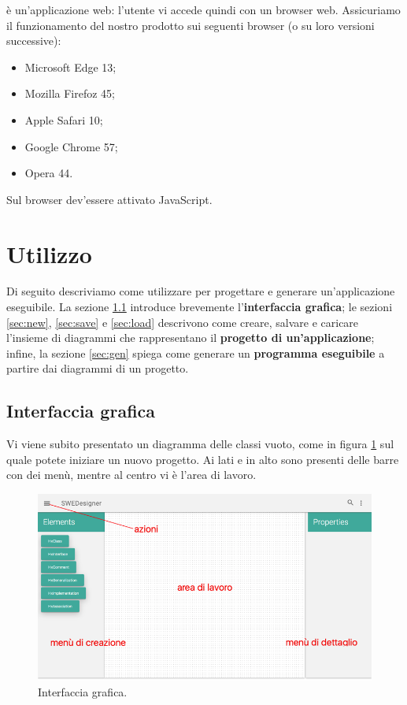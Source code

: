 \proj{} è un'applicazione web: l'utente vi accede quindi con un browser web. Assicuriamo il funzionamento del nostro prodotto sui seguenti browser (o su loro versioni successive):
\begin{itemize} %
	\item Microsoft Edge 13;
	\item Mozilla Firefoz 45;
	\item Apple Safari 10;
	\item Google Chrome 57;
	\item Opera 44.
\end{itemize}
Sul browser dev'essere attivato JavaScript.






\section{Utilizzo} \label{sec:utilizzo} %

Di seguito descriviamo come utilizzare \proj{} per progettare e generare un'applicazione eseguibile. La sezione \ref{sec:gui} introduce brevemente l'\textbf{interfaccia grafica}; le sezioni \ref{sec:new}, \ref{sec:save} e \ref{sec:load} descrivono come creare, salvare e caricare l'insieme di diagrammi che rappresentano il \textbf{progetto di un'applicazione}; infine, la sezione \ref{sec:gen} spiega come generare un \textbf{programma eseguibile} a partire dai diagrammi di un progetto.



\subsection{Interfaccia grafica} \label{sec:gui}

Vi viene subito presentato un diagramma delle classi vuoto, come in figura \ref{fig:screen} sul quale potete iniziare un nuovo progetto. Ai lati e in alto sono presenti delle barre con dei menù, mentre al centro vi è l'area di lavoro.

\begin{figure}
\centering
	\includegraphics[scale=0.46]{screen_index_2}
	\caption{Interfaccia grafica.}
	\label{fig:screen}
\end{figure}



